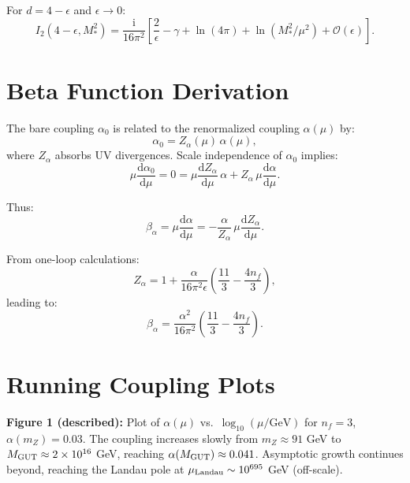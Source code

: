 \documentclass[11pt,a4paper]{article}
\numberwithin{equation}{section}
\theoremstyle{plain}
\theoremstyle{definition}
\theoremstyle{remark}
\newcommand{\dd}{\mathrm{d}}
\newcommand{\ii}{\mathrm{i}}
\begin{document}
For $d=4-\epsilon$ and $\epsilon\to 0$:
\begin{equation}
I_2(4-\epsilon,M_*^2) = \frac{\ii}{16\pi^2}\left[\frac{2}{\epsilon} - \gamma + \ln(4\pi) + \ln(M_*^2/\mu^2) + \mathcal{O}(\epsilon)\right].
\label{eq:I2-d4}
\end{equation}

\section{Beta Function Derivation}\label{app:beta}

The bare coupling $\alpha_0$ is related to the renormalized coupling $\alpha(\mu)$ by:
\begin{equation}
\alpha_0 = Z_\alpha(\mu)\,\alpha(\mu),
\label{eq:alpha-bare}
\end{equation}
where $Z_\alpha$ absorbs UV divergences. Scale independence of $\alpha_0$ implies:
\begin{equation}
\mu\frac{\dd\alpha_0}{\dd\mu} = 0 = \mu\frac{\dd Z_\alpha}{\dd\mu}\,\alpha + Z_\alpha\,\mu\frac{\dd\alpha}{\dd\mu}.
\label{eq:bare-scale-indep}
\end{equation}

Thus:
\begin{equation}
\beta_\alpha = \mu\frac{\dd\alpha}{\dd\mu} = -\frac{\alpha}{Z_\alpha}\,\mu\frac{\dd Z_\alpha}{\dd\mu}.
\label{eq:beta-from-Z}
\end{equation}

From one-loop calculations:
\begin{equation}
Z_\alpha = 1 + \frac{\alpha}{16\pi^2\epsilon}\left(\frac{11}{3}-\frac{4n_f}{3}\right),
\label{eq:Z-alpha-1loop}
\end{equation}
leading to:
\begin{equation}
\beta_\alpha = \frac{\alpha^2}{16\pi^2}\left(\frac{11}{3}-\frac{4n_f}{3}\right).
\label{eq:beta-final}
\end{equation}

\section{Running Coupling Plots}\label{app:plots}

\textbf{Figure 1 (described):} Plot of $\alpha(\mu)$ vs.\ $\log_{10}(\mu/\text{GeV})$ for $n_f=3$, $\alpha(m_Z)=0.03$. The coupling increases slowly from $m_Z\approx 91$ GeV to $M_{\rm GUT}\approx 2\times 10^{16}$ GeV, reaching $\alpha(M_{\rm GUT})\approx 0.041$. Asymptotic growth continues beyond, reaching the Landau pole at $\mu_{\rm Landau}\sim 10^{695}$ GeV (off-scale).
\end{document}
